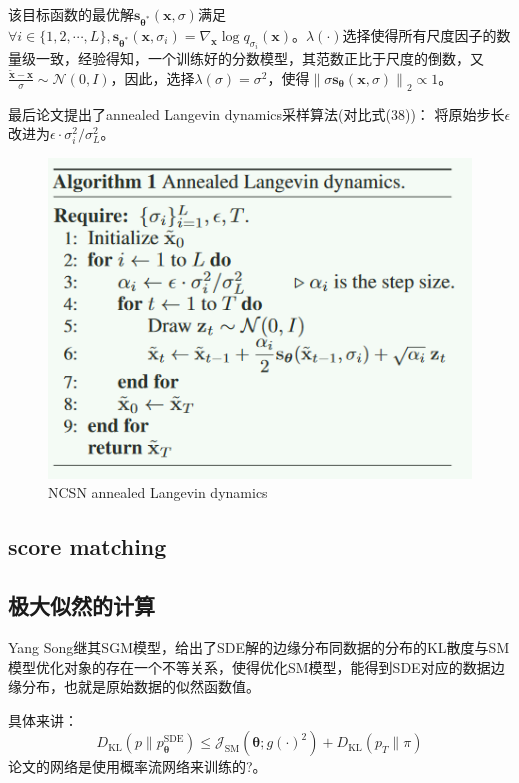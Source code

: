 \documentclass[lang=cn,newtx,10pt,scheme=chinese]{elegantbook}
\begin{document}
该目标函数的最优解$\mathbf{s}_{\boldsymbol{\theta}^*}(\mathbf{x}, \sigma)$满足
$\forall i \in \{1, 2, \cdots, L \}, \mathbf{s}_{\boldsymbol{\theta}^*}\left(\mathbf{x}, \sigma_i\right)=\nabla_{\mathbf{x}} \log q_{\sigma_i}(\mathbf{x})$。$\lambda(\cdot)$选择使得所有尺度因子的数量级一致，经验得知，一个训练好的分数模型，其范数正比于尺度的倒数，又$\frac{\tilde{\mathbf{x}}-\mathbf{x}}{\sigma} \sim \mathcal{N}(0, I)$，因此，选择$\lambda(\sigma)=\sigma^2$，使得$\left\|\sigma \mathbf{s}_{\boldsymbol{\theta}}(\mathbf{x}, \sigma)\right\|_2 \propto 1$。

最后论文提出了annealed Langevin dynamics采样算法(对比式(38))：
将原始步长$\epsilon$改进为$\epsilon \cdot \sigma^2_i / \sigma^2_L$。
\begin{figure}[h!]
\centering
\includegraphics[scale=0.9]{image/NCSNLD.jpg}
\caption{NCSN annealed Langevin dynamics}
\label{fig:NCSN}
\end{figure}

\subsection{score matching}

\subsection{极大似然的计算}
Yang Song继其SGM模型，给出了SDE解的边缘分布同数据的分布的KL散度与SM模型优化对象的存在一个不等关系，使得优化SM模型，能得到SDE对应的数据边缘分布，也就是原始数据的似然函数值。

具体来讲：
\begin{equation}
D_{\mathrm{KL}}\left(p \| p_{\boldsymbol{\theta}}^{\mathrm{SDE}}\right) \leq \mathcal{J}_{\mathrm{SM}}\left(\boldsymbol{\theta} ; g(\cdot)^2\right)+D_{\mathrm{KL}}\left(p_T \| \pi\right)
\end{equation}
论文的网络是使用概率流网络来训练的?。
\end{document}
